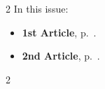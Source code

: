 \documentclass{article}
\date{November 2025}
\begin{document}
    \maketitle

    \setlength{\columnsep}{-5.0cm}
    \begin{multicols}{2}
        \noindent\textsf{In this issue:}
        \begin{itemize}
            \item \textsf{\textbf{1st Article}}, p.~\pageref{art01}.
            \item \textsf{\textbf{2nd Article}}, p.~\pageref{art02}.

        \end{itemize}
        \vfill\null
        \columnbreak

        
    \end{multicols}
    \pagebreak

    \setlength{\columnsep}{0.5cm}
    \begin{multicols}{2}
        
        

    \end{multicols}
\end{document}
